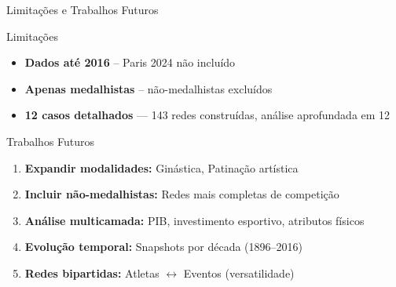 \begin{frame}{Limitações e Trabalhos Futuros}
    \begin{block}{Limitações}
        \footnotesize
        \begin{itemize}
            \item \textbf{Dados até 2016} -- Paris 2024 não incluído
            \item \textbf{Apenas medalhistas} -- não-medalhistas excluídos
            \item \textbf{12 casos detalhados} --- 143 redes construídas, análise aprofundada em 12
        \end{itemize}
    \end{block}

    \vspace{0.15cm}

    \begin{block}{Trabalhos Futuros}
        \footnotesize
        \begin{enumerate}
            \item \textbf{Expandir modalidades:} Ginástica, Patinação artística
            \item \textbf{Incluir não-medalhistas:} Redes mais completas de competição
            \item \textbf{Análise multicamada:} PIB, investimento esportivo, atributos físicos
            \item \textbf{Evolução temporal:} Snapshots por década (1896--2016)
            \item \textbf{Redes bipartidas:} Atletas $\leftrightarrow$ Eventos (versatilidade)
        \end{enumerate}
    \end{block}
\end{frame}
